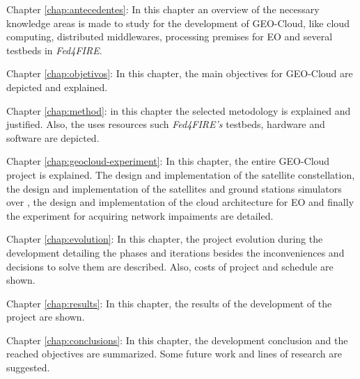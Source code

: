 \begin{definitionlist}
\item[Chapter \ref{chap:antecedentes}: \nameref{chap:antecedentes}] In this
  chapter an overview of the necessary knowledge areas is made to study for the
  development of GEO-Cloud, like cloud computing, distributed middlewares,
  processing premises for \ac{EO} and several testbeds in \emph{Fed4FIRE}.
\item[Chapter \ref{chap:objetivos}: \nameref{chap:objetivos}] In this
  chapter, the main objectives for GEO-Cloud are depicted and explained.
\item[Chapter \ref{chap:method}: \nameref{chap:method}] in this chapter the
  selected metodology is explained and justified. Also, the uses resources such
  \emph{Fed4FIRE's} testbeds, hardware and software are depicted.
\item[Chapter \ref{chap:geocloud-experiment}: \nameref{chap:geocloud-experiment}] In this
  chapter, the entire GEO-Cloud project is explained. The design and implementation of the
  satellite constellation, the design and implementation of the satellites and
  ground stations simulators over \vw, the design and implementation of the
  cloud architecture for \ac{EO} and finally the \pl experiment for acquiring
  network impaiments are detailed.
\item[Chapter \ref{chap:evolution}: \nameref{chap:evolution}] In this chapter,
  the project evolution during the development detailing the phases and
  iterations besides the inconveniences and decisions to solve them are
  described. Also, costs of project and schedule are shown.
\item[Chapter \ref{chap:results}: \nameref{chap:results}] In this chapter, the
  results of the development of the project are shown.
\item[Chapter \ref{chap:conclusions}: \nameref{chap:conclusions}]In this
  chapter, the development conclusion and the reached objectives are
  summarized. Some future work and lines of research are suggested.
 \end{definitionlist}
